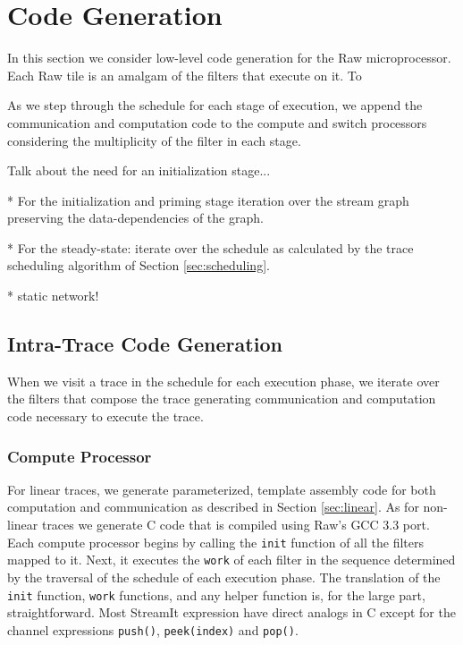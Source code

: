 \section{Code Generation}
\label{sec:codegen}
In this section we consider low-level code generation for the Raw
microprocessor. Each Raw tile is an amalgam of the filters that
execute on it. To 

As we step through the schedule for each stage of
execution, we append the communication and computation code to the
compute and switch processors considering the multiplicity of the
filter in each stage.

Talk about the need for an initialization stage...

* For the initialization and priming stage iteration over the stream
graph preserving the data-dependencies of the graph.

* For the steady-state: iterate over the schedule as calculated by the trace scheduling
algorithm of Section \ref{sec:scheduling}.

* static network!

\subsection{Intra-Trace Code Generation}
When we visit a trace in the schedule for each execution phase, we
iterate over the filters that compose the trace generating 
communication and computation code necessary to execute the trace.

\subsubsection{Compute Processor}
For linear traces, we generate parameterized, template assembly code
for both computation and communication as described in Section
\ref{sec:linear}.  As for non-linear traces we generate C code that is
compiled using Raw's GCC 3.3 port.  Each compute processor begins by
calling the {\tt init} function of all the filters mapped to it.  Next,
it executes the {\tt work} of each filter in the sequence determined
by the traversal of the schedule of each execution phase.
The translation of the {\tt init} function, {\tt work} functions, and
any helper function is, for the large part, straightforward.  Most
StreamIt expression have direct analogs in C except for the channel
expressions {\tt push()}, {\tt peek(index)} and {\tt pop()}.

